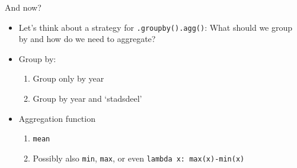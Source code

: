 \documentclass{beamer}
\begin{document}
\begin{frame}{And now?}
\begin{itemize}[<+->]
	\item Let’s think about a strategy for \texttt{.groupby().agg()}: What should we group by and how do we need to aggregate?
	\item Group by:
	\begin{enumerate}
		\item Group only by year
		\item  Group by year and `stadsdeel'
	\end{enumerate}
	\item Aggregation function
	\begin{enumerate}
		\item \texttt{mean}
		\item Possibly also \texttt{min}, \texttt{max}, or even \texttt{lambda x: max(x)-min(x)}
	\end{enumerate}
\end{itemize}

\end{frame}
\end{document}
